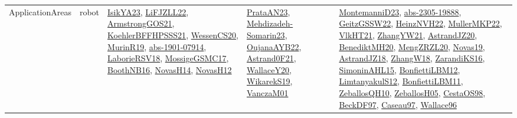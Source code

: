 {\begin{longtable}{llp{6cm}p{6cm}p{6cm}}
ApplicationAreas & robot & \href{articles/IsikYA23.pdf}{IsikYA23}\cite{IsikYA23}, \href{papers/LiFJZLL22.pdf}{LiFJZLL22}\cite{LiFJZLL22}, \href{papers/ArmstrongGOS21.pdf}{ArmstrongGOS21}\cite{ArmstrongGOS21}, \href{articles/KoehlerBFFHPSSS21.pdf}{KoehlerBFFHPSSS21}\cite{KoehlerBFFHPSSS21}, \href{papers/WessenCS20.pdf}{WessenCS20}\cite{WessenCS20}, \href{papers/MurinR19.pdf}{MurinR19}\cite{MurinR19}, \href{articles/abs-1901-07914.pdf}{abs-1901-07914}\cite{abs-1901-07914}, \href{articles/LaborieRSV18.pdf}{LaborieRSV18}\cite{LaborieRSV18}, \href{papers/MossigeGSMC17.pdf}{MossigeGSMC17}\cite{MossigeGSMC17}, \href{papers/BoothNB16.pdf}{BoothNB16}\cite{BoothNB16}, \href{articles/NovasH14.pdf}{NovasH14}\cite{NovasH14}, \href{articles/NovasH12.pdf}{NovasH12}\cite{NovasH12} & \href{articles/PrataAN23.pdf}{PrataAN23}\cite{PrataAN23}, \href{papers/Mehdizadeh-Somarin23.pdf}{Mehdizadeh-Somarin23}\cite{Mehdizadeh-Somarin23}, \href{papers/OujanaAYB22.pdf}{OujanaAYB22}\cite{OujanaAYB22}, \href{papers/Astrand0F21.pdf}{Astrand0F21}\cite{Astrand0F21}, \href{articles/WallaceY20.pdf}{WallaceY20}\cite{WallaceY20}, \href{articles/WikarekS19.pdf}{WikarekS19}\cite{WikarekS19}, \href{papers/VanczaM01.pdf}{VanczaM01}\cite{VanczaM01} & \href{articles/MontemanniD23.pdf}{MontemanniD23}\cite{MontemanniD23}, \href{articles/abs-2305-19888.pdf}{abs-2305-19888}\cite{abs-2305-19888}, \href{papers/GeitzGSSW22.pdf}{GeitzGSSW22}\cite{GeitzGSSW22}, \href{articles/HeinzNVH22.pdf}{HeinzNVH22}\cite{HeinzNVH22}, \href{articles/MullerMKP22.pdf}{MullerMKP22}\cite{MullerMKP22}, \href{articles/VlkHT21.pdf}{VlkHT21}\cite{VlkHT21}, \href{articles/ZhangYW21.pdf}{ZhangYW21}\cite{ZhangYW21}, \href{articles/AstrandJZ20.pdf}{AstrandJZ20}\cite{AstrandJZ20}, \href{articles/BenediktMH20.pdf}{BenediktMH20}\cite{BenediktMH20}, \href{articles/MengZRZL20.pdf}{MengZRZL20}\cite{MengZRZL20}, \href{articles/Novas19.pdf}{Novas19}\cite{Novas19}, \href{papers/AstrandJZ18.pdf}{AstrandJZ18}\cite{AstrandJZ18}, \href{articles/ZhangW18.pdf}{ZhangW18}\cite{ZhangW18}, \href{articles/ZarandiKS16.pdf}{ZarandiKS16}\cite{ZarandiKS16}, \href{articles/SimoninAHL15.pdf}{SimoninAHL15}\cite{SimoninAHL15}, \href{papers/BonfiettiLBM12.pdf}{BonfiettiLBM12}\cite{BonfiettiLBM12}, \href{articles/LimtanyakulS12.pdf}{LimtanyakulS12}\cite{LimtanyakulS12}, \href{papers/BonfiettiLBM11.pdf}{BonfiettiLBM11}\cite{BonfiettiLBM11}, \href{articles/ZeballosQH10.pdf}{ZeballosQH10}\cite{ZeballosQH10}, \href{articles/ZeballosH05.pdf}{ZeballosH05}\cite{ZeballosH05}, \href{papers/CestaOS98.pdf}{CestaOS98}\cite{CestaOS98}, \href{papers/BeckDF97.pdf}{BeckDF97}\cite{BeckDF97}, \href{papers/Caseau97.pdf}{Caseau97}\cite{Caseau97}, \href{articles/Wallace96.pdf}{Wallace96}\cite{Wallace96}\\

\end{longtable}}
